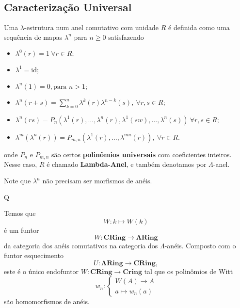 \documentclass[11pt,twoside,a4paper]{book}
\begin{document}
\subsection{Caracterização Universal}
\begin{definicao}
Uma $\lambda$-estrutura num anel comutativo com unidade $R$ é definida como uma sequência de mapas $\lambda^n$ para $n \ge 0$ satisfazendo
\begin{itemize}
    \item $\lambda^0(r) = 1 \ \forall r \in R;$
    \item $\lambda^1 = \mbox{id};$
    \item $\lambda^n(1) = 0, \mbox{para } n > 1;$
    \item $\lambda^n(r + s) = \sum\limits_{k = 0}^n \lambda^k(r) \lambda^{n-k}(s), \ \forall r,s \in R;$
    \item $\lambda^n(rs) = P_n(\lambda^1(r), \ldots, \lambda^n(r),\lambda^1(sw), \ldots, \lambda^n(s)) \ \forall r,s \in R;$
    \item $\lambda^m(\lambda^n(r)) =P_{m,n}(\lambda^1(r), \ldots, \lambda^{mn}(r)), \ \forall r \in R.$
\end{itemize}
onde $P_n$ e $P_{m,n}$ são certos \textbf{polinômios universais} com coeficientes inteiros. Nesse caso, $R$ é chamado \textbf{Lambda-Anel}, e também denotamos por $\Lambda$-anel. 
\end{definicao}
Note que $\lambda^n$ não precisam ser morfismos de anéis.
\begin{exemplo}
Q
\end{exemplo}
\begin{teorema}
Temos que
\[
W \colon k \mapsto W(k)
\]
é um funtor
\[
W \colon \mathbf{CRing} \to \mathbf{\Lambda Ring}
\]
da categoria dos anéis comutativos na categoria dos $\Lambda$-anéis.
Composto com o funtor esquecimento
\[
U \colon \mathbf{\Lambda Ring} \to \mathbf{CRing}, 
\]
este é o único endofuntor $W \colon \mathbf{CRing} \to \mathbf{Cring}$ tal que os polinômios de Witt
\[
w_n \colon \begin{cases}
W(A) \to A \\
a \mapsto w_n(a)
\end{cases}
\]
são homomorfismos de anéis.
\end{teorema}
\end{document}
